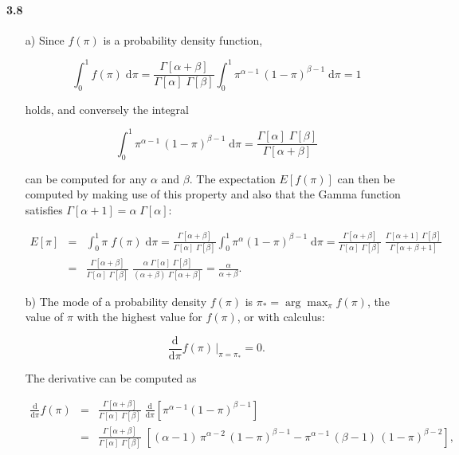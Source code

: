 \documentclass[fontsize=11pt,DIV=18,parskip=half]{scrartcl}
\begin{document}
\paragraph{3.8}
\begin{enumerate}
\item[a)] Since $f(\pi)$ is a probability density function, 

\begin{equation*}
\int_0^1 f(\pi) \;\text{d}\pi = \frac{\Gamma[\alpha+\beta]}{\Gamma[\alpha]\; \Gamma[\beta]} \int_0^1 \pi^{\alpha-1} \, (1-\pi)^{\beta-1} \;\text{d}\pi = 1
\end{equation*}

holds, and conversely the integral

\begin{equation*}
 \int_0^1 \pi^{\alpha-1} \, (1-\pi)^{\beta-1} \;\text{d}\pi = \frac{\Gamma[\alpha]\; \Gamma[\beta]}{\Gamma[\alpha+\beta]}
\end{equation*}

can be computed for any $\alpha$ and $\beta$. The expectation $E[f(\pi)]$ can then be computed by making use of this property and also that the Gamma function satisfies $\Gamma[\alpha+1] = \alpha\;\Gamma[\alpha]$:

\begin{eqnarray*}
E[\pi] &=& \int_0^1 \pi \; f(\pi) \; \text{d}\pi = \frac{\Gamma[\alpha+\beta]}{\Gamma[\alpha]\; \Gamma[\beta]} \int_0^1 \pi^\alpha (1-\pi)^{\beta-1} \; \text{d}\pi = \frac{\Gamma[\alpha+\beta]}{\Gamma[\alpha]\; \Gamma[\beta]} \; \frac{\Gamma[\alpha+1]\; \Gamma[\beta]}{\Gamma[\alpha+\beta+1]} \\
&=& \frac{\Gamma[\alpha+\beta]}{\Gamma[\alpha]\; \Gamma[\beta]} \; \frac{\alpha \; \Gamma[\alpha]\; \Gamma[\beta]}{(\alpha+\beta)\;\Gamma[\alpha+\beta]} = \frac{\alpha}{\alpha+\beta}.
\end{eqnarray*}


\item[b)] The mode of a probability density $f(\pi)$ is $\pi_* = \arg\max_\pi f(\pi)$, the value of $\pi$ with the highest value for $f(\pi)$, or with calculus:

\begin{equation*}
\frac{\text{d}}{\text{d}\pi} f(\pi) \, \big|_{\pi = \pi_*} = 0.
\end{equation*}

The derivative can be computed as

\begin{eqnarray*}
\frac{\text{d}}{\text{d}\pi} f(\pi) &=& \frac{\Gamma[\alpha+\beta]}{\Gamma[\alpha]\; \Gamma[\beta]} \; \frac{\text{d}}{\text{d}\pi} \left[\pi^{\alpha-1} (1-\pi)^{\beta-1} \right] \\
&=& \frac{\Gamma[\alpha+\beta]}{\Gamma[\alpha]\; \Gamma[\beta]} \; \left[(\alpha-1)\,\pi^{\alpha-2}\,(1-\pi)^{\beta-1} - \pi^{\alpha-1} \, (\beta-1) \, (1-\pi)^{\beta-2}\right],\\
\end{eqnarray*}


\end{enumerate}
\end{document}
